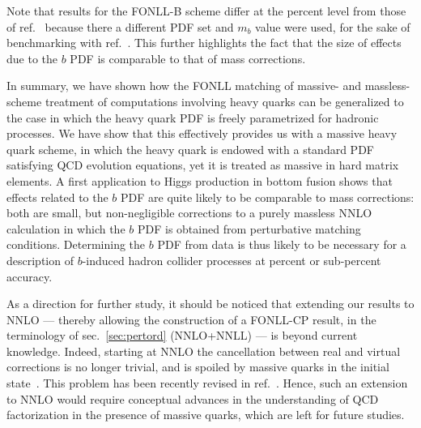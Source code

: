 Note that results for the FONLL-B
scheme differ at the percent level from those of 
ref.~\cite{Forte:2016sja} because there a different PDF set and $m_b$
value were used,
for the sake of benchmarking with
ref.~\cite{Bonvini:2015pxa,Bonvini:2016fgf}. This further highlights
the fact that the size of effects due to the $b$ PDF is comparable to
that of mass corrections.

In summary, we have shown how the FONLL matching of massive- and
massless-scheme treatment of computations involving heavy quarks can
be generalized to the case in which the heavy quark PDF is freely
parametrized for hadronic processes. We have show that this
effectively provides us with a massive heavy quark scheme, in which
the heavy quark is endowed with a standard PDF satisfying QCD
evolution equations, yet it is treated as massive in hard matrix
elements. A first application to Higgs production in bottom fusion
shows that effects related to the $b$ PDF are quite likely to be
comparable to mass corrections: both are small, but non-negligible
corrections to a purely massless NNLO calculation in which the $b$ PDF
is obtained from perturbative matching conditions. Determining the $b$
PDF from data is thus likely to be necessary for a description of
$b$-induced hadron collider processes at percent or sub-percent accuracy.

As a direction for further study, it should be noticed that extending
our results to NNLO --- thereby allowing the construction of a
FONLL-CP result, in the terminology of sec.~\ref{sec:pertord}
(NNLO+NNLL) --- is beyond current knowledge. Indeed, starting at NNLO
the cancellation between real and virtual
corrections is no longer trivial, and is spoiled by
massive quarks in the initial
state~\cite{Doria:1980ak,Catani:1985xt}. 
This problem has been recently revised in ref.~\cite{Caola:2020xup}.
Hence, such an extension to NNLO
would require conceptual advances in the understanding of QCD
factorization in the presence of massive quarks, which are left for
future studies.

